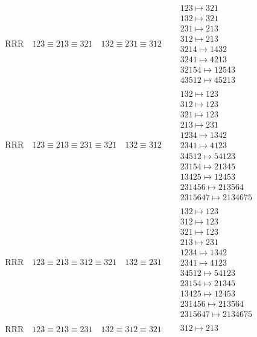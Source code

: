 \documentclass{article}
\begin{document}
\begin{align}
\text{RRR}
\quad
123\equiv213\equiv321
\quad
132\equiv231\equiv312
\quad
&
\begin{matrix}
123 \mapsto 321
\\
132 \mapsto 321
\\
231 \mapsto 213
\\
312 \mapsto 213
\\
3214 \mapsto 1432
\\
3241 \mapsto 4213
\\
32154 \mapsto 12543
\\
43512 \mapsto 45213
\end{matrix}
\\
\text{RRR}
\quad
123\equiv213\equiv231\equiv321
\quad
132\equiv312
\quad
&
\begin{matrix}
132 \mapsto 123
\\
312 \mapsto 123
\\
321 \mapsto 123
\\
213 \mapsto 231
\\
1234 \mapsto 1342
\\
2341 \mapsto 4123
\\
34512 \mapsto 54123
\\
23154 \mapsto 21345
\\
13425 \mapsto 12453
\\
231456 \mapsto 213564
\\
2315647 \mapsto 2134675
\end{matrix}
\\
\text{RRR}
\quad
123\equiv213\equiv312\equiv321
\quad
132\equiv231
\quad
&
\begin{matrix}
132 \mapsto 123
\\
312 \mapsto 123
\\
321 \mapsto 123
\\
213 \mapsto 231
\\
1234 \mapsto 1342
\\
2341 \mapsto 4123
\\
34512 \mapsto 54123
\\
23154 \mapsto 21345
\\
13425 \mapsto 12453
\\
231456 \mapsto 213564
\\
2315647 \mapsto 2134675
\end{matrix}
\\
\text{RRR}
\quad
123\equiv213\equiv231
\quad
132\equiv312\equiv321
\quad
&
\begin{matrix}
312 \mapsto 213
\\

\end{matrix}
\end{align}
\end{document}
